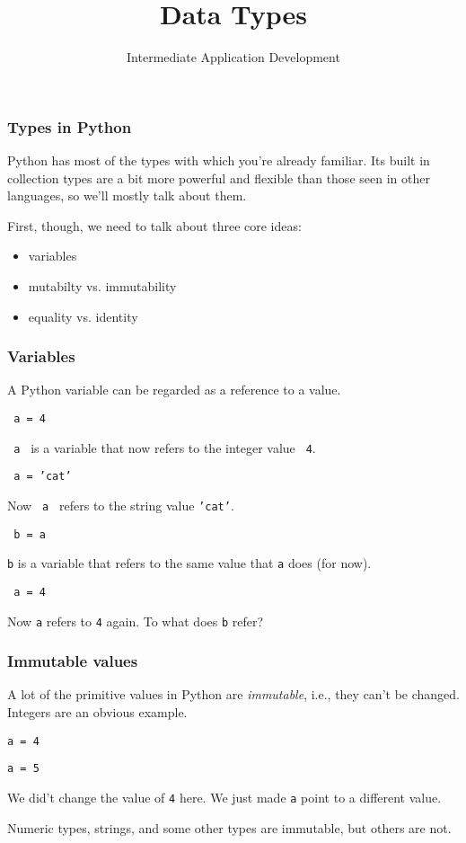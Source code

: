 \documentclass[10pt]{beamer}
\title{Data Types}
\author[IN608]{Intermediate Application Development}
\institute[Otago Polytechnic]{
  Otago Polytechnic \\
  Dunedin, New Zealand \\
  Kaiako: Tom Clark
}
\date{}
\begin{document}
\begin{frame}[plain]
  \titlepage
\end{frame}

\begin{frame}
  \frametitle{Types in Python}
   
   Python has most of the types with which you're already familiar. Its
   built in collection types are a bit more powerful and flexible than 
   those seen in other languages, so we'll mostly talk about them.

   First, though, we need to talk about three core ideas:
   \begin{itemize}
     \item variables
	 \item mutabilty vs. immutability
	 \item equality vs. identity
   \end{itemize}
      
\end{frame}

\begin{frame}
  \frametitle{Variables}
   
  A Python variable can be regarded as a reference to a value.

  \texttt{ a = 4}

  \texttt{ a } is a variable that now refers to the integer value \texttt{ 4}.
      
  \texttt{ a = 'cat'}

  Now \texttt{ a } refers to the string value \texttt{'cat'}.
  
  \texttt{ b = a}
  
  \texttt{b} is a variable that refers to the same value that \texttt{a} does  (for now). 

  \texttt{ a = 4}

  Now \texttt{a} refers to \texttt{4} again. To what does \texttt{b} refer?
  
\end{frame}

\begin{frame}
  \frametitle{Immutable values}
   
  A lot of the primitive values in Python are \emph{immutable}, i.e., they can't
  be changed. Integers are an obvious example.

  \texttt{a = 4}

  \texttt{a = 5}
  
  We did't change the value of \texttt{4} here. We just made \texttt{a} point to a
  different value.
  
  Numeric types, strings, and some other types are immutable, but others are not.
  
\end{frame}
\end{document}
